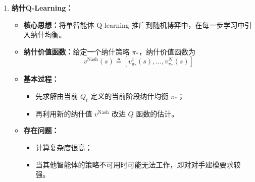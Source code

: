 \documentclass[../main.tex]{subfiles}
\begin{document}
\begin{enumerate}
\begin{itemize}
        \item \textbf{随机博弈中的纳什均衡：}
        \begin{itemize}
            \item 智能体的优化目标取决于联合策略 $\pi$；
            \item 随机博弈中的纳什均衡由一个特定的联合策略表示：
            $$
            \pi_* \triangleq [\pi_*^1,\ldots,\pi_*^N]
            $$
            \item 其定义为：在给定其他智能体策略的情况下，没有任何一个智能体愿意单独改变自己的策略，即
            $$
            v^j(s;\pi_*)=v^j(s;\pi_*^j,\pi_*^{-j})\geq v^j(s;\pi^j,\pi_*^{-j})
            $$
            其中
            $$
            \pi_*^{-j}\triangleq[\pi_*^1,\ldots,\pi_*^{j-1},\pi_*^{j+1},\ldots,\pi_*^N]
            $$
        \end{itemize}

        \item \textbf{从多智能体到多智能体强化学习：}
        \begin{itemize}
            \item 当智能体数量增加时，奖励函数与状态转移概率都会随智能体数目呈指数级增长；
            \item 因而多智能体强化学习通常面临：
            \begin{itemize}
                \item 更难建模；
                \item 环境更具动态性和敏感性；
                \item 需要更多探索数据；
                \item 需要更多计算资源。
            \end{itemize}
        \end{itemize}
    \end{itemize}

    \item \textbf{纳什Q-Learning：}
    \begin{itemize}
        \item \textbf{核心思想：}将单智能体 Q-learning 推广到随机博弈中，在每一步学习中引入纳什均衡。
        \item \textbf{纳什价值函数：}给定一个纳什策略 $\pi_*$，纳什价值函数为
        $$
        v^{\mathrm{Nash}}(s)\triangleq [v_{\pi_*}^1(s),\ldots,v_{\pi_*}^N(s)]
        $$
        \item \textbf{基本过程：}
        \begin{itemize}
            \item 先求解由当前 $Q_t$ 定义的当前阶段纳什均衡 $\pi_*$；
            \item 再利用新的纳什值 $v^{\mathrm{Nash}}$ 改进 $Q$ 函数的估计。
        \end{itemize}
        \item \textbf{存在问题：}
        \begin{itemize}
            \item 计算复杂度很高；
            \item 当其他智能体的策略不可用时可能无法工作，即对对手建模要求较强。
        \end{itemize}
    \end{itemize}
\end{enumerate}
\end{document}

